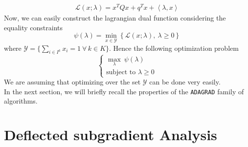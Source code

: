 \documentclass[notitlepage]{article}
\begin{document}
\begin{align*}
  \mathcal{L}(x;\lambda) = x^T Q x + q^T x + \left\langle \lambda,x \right\rangle 
\end{align*}
Now, we can easily construct the lagrangian dual function considering the equality constraints
\[
  \psi(\lambda) = \min_{x \in \mathcal{Y}} \left\lbrace \mathcal{L}(x;\lambda) ,\ \lambda \ge 0 \right\rbrace
\]
where $\mathcal{Y} = \{\sum_{i \in I^k} x_i = 1 \ \forall\, k \in K\}$. Hence the following optimization problem
\begin{equation}
  \begin{cases}
    \max_{\lambda}\  \psi(\lambda)  \\
    \text{subject to } \lambda \ge 0 
  \end{cases}
  \label{eqn:dual_problem}  
  \tag{$D$}
\end{equation}
We are assuming that optimizing over the set $\mathcal{Y}$ can be done very easily.\\ 
In the next section, we will briefly recall the properties of the \texttt{ADAGRAD} family of algorithms\cite{JMLR:v12:duchi11a}.%

\section{Deflected subgradient Analysis}
\end{document}
